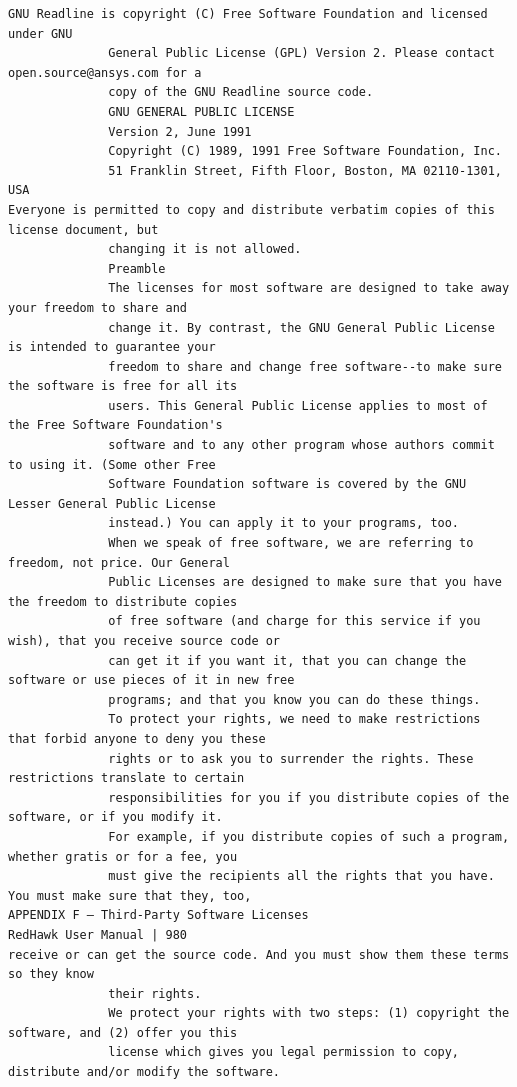 \begin{lstlisting}[basicstyle=\ttfamily\scriptsize,breaklines=true]
              GNU Readline is copyright (C) Free Software Foundation and licensed under GNU
              General Public License (GPL) Version 2. Please contact open.source@ansys.com for a
              copy of the GNU Readline source code.
              GNU GENERAL PUBLIC LICENSE
              Version 2, June 1991
              Copyright (C) 1989, 1991 Free Software Foundation, Inc.
              51 Franklin Street, Fifth Floor, Boston, MA 02110-1301, USA
Everyone is permitted to copy and distribute verbatim copies of this license document, but
              changing it is not allowed.
              Preamble
              The licenses for most software are designed to take away your freedom to share and
              change it. By contrast, the GNU General Public License is intended to guarantee your
              freedom to share and change free software--to make sure the software is free for all its
              users. This General Public License applies to most of the Free Software Foundation's
              software and to any other program whose authors commit to using it. (Some other Free
              Software Foundation software is covered by the GNU Lesser General Public License
              instead.) You can apply it to your programs, too.
              When we speak of free software, we are referring to freedom, not price. Our General
              Public Licenses are designed to make sure that you have the freedom to distribute copies
              of free software (and charge for this service if you wish), that you receive source code or
              can get it if you want it, that you can change the software or use pieces of it in new free
              programs; and that you know you can do these things.
              To protect your rights, we need to make restrictions that forbid anyone to deny you these
              rights or to ask you to surrender the rights. These restrictions translate to certain
              responsibilities for you if you distribute copies of the software, or if you modify it.
              For example, if you distribute copies of such a program, whether gratis or for a fee, you
              must give the recipients all the rights that you have. You must make sure that they, too,
APPENDIX F — Third-Party Software Licenses                                    RedHawk User Manual | 980
receive or can get the source code. And you must show them these terms so they know
              their rights.
              We protect your rights with two steps: (1) copyright the software, and (2) offer you this
              license which gives you legal permission to copy, distribute and/or modify the software.

\end{lstlisting}
